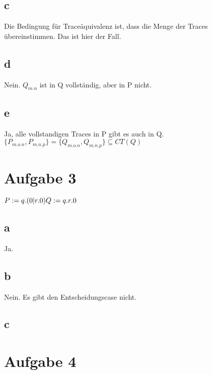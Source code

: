 \documentclass[]{article}
\begin{document}
\subsection{c}
Die Bedingung  für Traceäquivalenz ist, dass die Menge der Traces übereinstimmen. Das ist hier der Fall. 
\subsection{d}
Nein. $Q_{m.n}$ ist in Q vollständig, aber in P nicht.
\subsection{ e}
Ja, alle vollstandigen Traces in P gibt es auch in Q. \\
 $ \{ P_{m.o.n},      P_{m.n.p} \} =  \{ Q_{m.o.n},      Q_{m.n.p}                                                 \}\subseteq CT(Q)      $
 \section{Aufgabe 3}
 
 \textit{$P := q.(0 | r.0)  \\ 
 	         Q:= q.r.0  $}
 \subsection{a}
 Ja.
 \subsection{b}
 Nein. Es gibt den Entscheidungscase nicht.
 
 \subsection{c}

 \section{Aufgabe 4}

 
\end{document}
